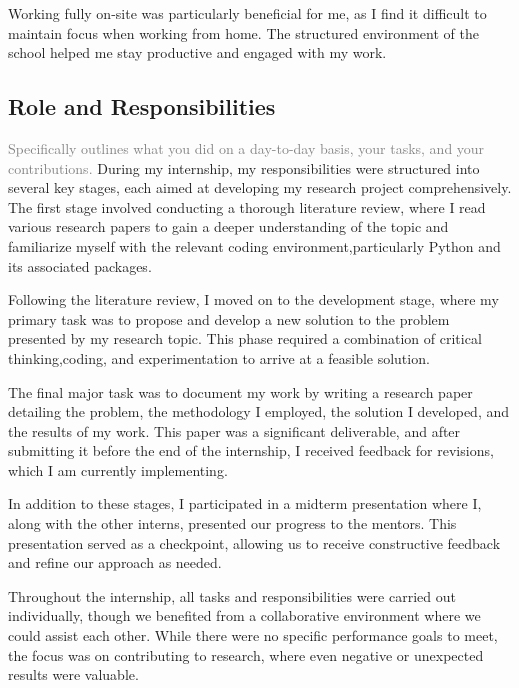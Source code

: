 Working fully on-site was particularly beneficial for me, as I find it difficult to maintain focus when working from
home.
The structured environment of the school helped me stay productive and engaged with my work.

\subsection{Role and Responsibilities}\label{subsec:role-and-responsibilities}
\textcolor{gray}
{Specifically outlines what you did on a day-to-day basis, your tasks, and your contributions.}
During my internship, my responsibilities were structured into several key stages, each aimed at developing my research
project comprehensively.
The first stage involved conducting a thorough literature review, where I read various research papers to gain a deeper
understanding of the topic and familiarize myself with the relevant coding environment,particularly Python and its
associated packages.

Following the literature review, I moved on to the development stage, where my primary task was to propose and develop a
new solution to the problem presented by my research topic.
This phase required a combination of critical thinking,coding, and experimentation to arrive at a feasible solution.

The final major task was to document my work by writing a research paper detailing the problem, the methodology I
employed, the solution I developed, and the results of my work.
This paper was a significant deliverable, and after submitting it before the end of the internship, I received feedback
for revisions, which I am currently implementing.

In addition to these stages, I participated in a midterm presentation where I, along with the other interns, presented
our progress to the mentors.
This presentation served as a checkpoint, allowing us to receive constructive feedback and refine our approach as
needed.

Throughout the internship, all tasks and responsibilities were carried out individually, though we benefited from a
collaborative environment where we could assist each other.
While there were no specific performance goals to meet, the focus was on contributing to research, where even negative
or unexpected results were valuable.

